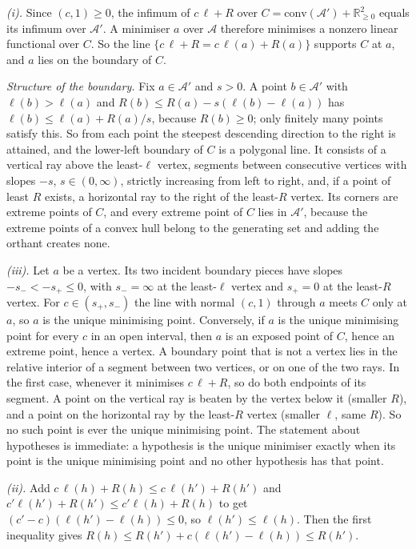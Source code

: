 \emph{(i).} Since $(c,1)\ge0$, the infimum of $c\,\ell+R$ over $C=\mathrm{conv}(\mathcal A')+\mathbb R^2_{\ge0}$ equals its infimum over $\mathcal A'$. A minimiser $a$ over $\mathcal A$ therefore minimises a nonzero linear functional over $C$. So the line $\{c\,\ell+R=c\,\ell(a)+R(a)\}$ supports $C$ at $a$, and $a$ lies on the boundary of $C$.

\emph{Structure of the boundary.} Fix $a\in\mathcal A'$ and $s>0$. A point $b\in\mathcal A'$ with $\ell(b)>\ell(a)$ and $R(b)\le R(a)-s(\ell(b)-\ell(a))$ has $\ell(b)\le\ell(a)+R(a)/s$, because $R(b)\ge0$; only finitely many points satisfy this. So from each point the steepest descending direction to the right is attained, and the lower-left boundary of $C$ is a polygonal line. It consists of a vertical ray above the least-$\ell$ vertex, segments between consecutive vertices with slopes $-s$, $s\in(0,\infty)$, strictly increasing from left to right, and, if a point of least $R$ exists, a horizontal ray to the right of the least-$R$ vertex. Its corners are extreme points of $C$, and every extreme point of $C$ lies in $\mathcal A'$, because the extreme points of a convex hull belong to the generating set and adding the orthant creates none.

\emph{(iii).} Let $a$ be a vertex. Its two incident boundary pieces have slopes $-s_-<-s_+\le0$, with $s_-=\infty$ at the least-$\ell$ vertex and $s_+=0$ at the least-$R$ vertex. For $c\in(s_+,s_-)$ the line with normal $(c,1)$ through $a$ meets $C$ only at $a$, so $a$ is the unique minimising point. Conversely, if $a$ is the unique minimising point for every $c$ in an open interval, then $a$ is an exposed point of $C$, hence an extreme point, hence a vertex. A boundary point that is not a vertex lies in the relative interior of a segment between two vertices, or on one of the two rays. In the first case, whenever it minimises $c\,\ell+R$, so do both endpoints of its segment. A point on the vertical ray is beaten by the vertex below it (smaller $R$), and a point on the horizontal ray by the least-$R$ vertex (smaller $\ell$, same $R$). So no such point is ever the unique minimising point. The statement about hypotheses is immediate: a hypothesis is the unique minimiser exactly when its point is the unique minimising point and no other hypothesis has that point.

\emph{(ii).} Add $c\,\ell(h)+R(h)\le c\,\ell(h')+R(h')$ and $c'\ell(h')+R(h')\le c'\ell(h)+R(h)$ to get $(c'-c)(\ell(h')-\ell(h))\le0$, so $\ell(h')\le\ell(h)$. Then the first inequality gives $R(h)\le R(h')+c(\ell(h')-\ell(h))\le R(h')$.

